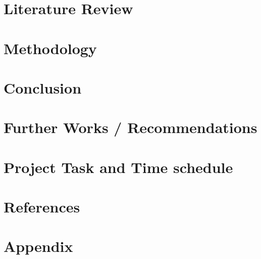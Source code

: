 \documentclass[12pt]{article}
\begin{document}
\section{Literature Review}

\newpage

\section{ Methodology}

\newpage

% 

% 

\section{Conclusion}

\newpage


 \section{Further Works / Recommendations }

\newpage

% 

% 

\section{Project Task and Time schedule}

\newpage

\newpage
\section{References}
\printbibliography[heading=none]


\section{Appendix}

\newpage
\end{document}
